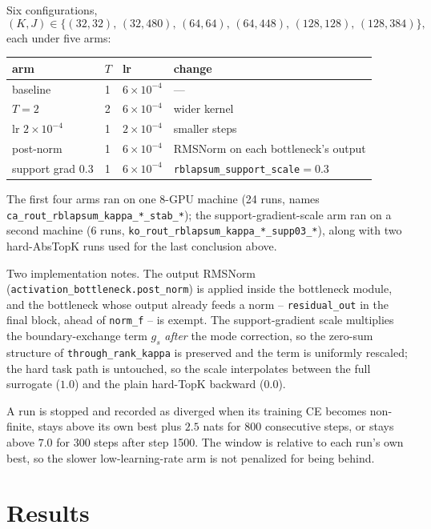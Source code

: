 \documentclass[11pt,a4paper]{article}
\newcommand{\code}[1]{\texttt{#1}}
\begin{document}
Six configurations,
\[
(K,J)\in\{(32,32),\,(32,480),\,(64,64),\,(64,448),\,(128,128),\,(128,384)\},
\]
each under five arms:

\begin{center}\small
\begin{tabular}{llll}
\toprule
arm & $T$ & lr & change \\
\midrule
baseline           & 1 & $6\times10^{-4}$ & --- \\
$T=2$              & 2 & $6\times10^{-4}$ & wider kernel \\
lr $2\times10^{-4}$ & 1 & $2\times10^{-4}$ & smaller steps \\
post-norm          & 1 & $6\times10^{-4}$ & RMSNorm on each bottleneck's output \\
support grad $0.3$ & 1 & $6\times10^{-4}$ & \code{rblapsum\_support\_scale}$=0.3$ \\
\bottomrule
\end{tabular}
\end{center}

The first four arms ran on one 8-GPU machine (24 runs, names
\code{ca\_rout\_rblapsum\_kappa\_*\_stab\_*}); the support-gradient-scale arm ran on
a second machine (6 runs, \code{ko\_rout\_rblapsum\_kappa\_*\_supp03\_*}),
along with two hard-AbsTopK runs used for the last conclusion above.

Two implementation notes. The output RMSNorm
(\code{activation\_bottleneck.post\_norm}) is applied inside the bottleneck
module, and the bottleneck whose output already feeds a norm --
\code{residual\_out} in the final block, ahead of \code{norm\_f} -- is
exempt. The support-gradient scale multiplies the boundary-exchange term $g_s$
\emph{after} the mode correction, so the zero-sum structure of
\code{through\_rank\_kappa} is preserved and the term is uniformly
rescaled; the hard task path is untouched, so the scale interpolates
between the full surrogate ($1.0$) and the plain hard-TopK backward
($0.0$).

A run is stopped and recorded as diverged when its training CE becomes
non-finite, stays above its own best plus $2.5$ nats for 800 consecutive
steps, or stays above $7.0$ for 300 steps after step 1500. The window is
relative to each run's own best, so the slower low-learning-rate arm is not
penalized for being behind.

\section{Results}
\end{document}
